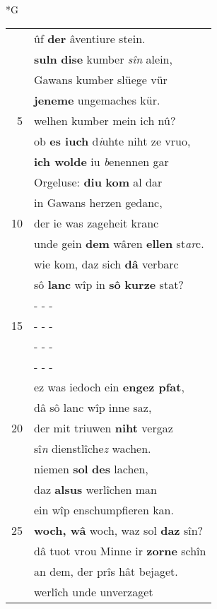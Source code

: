 \documentclass[8pt,a4paper,notitlepage]{article}
\begin{document}
\newpage
\begin{table}[ht]
\begin{minipage}[t]{0.5\linewidth}
\small
\begin{center}*G
\end{center}
\begin{tabular}{rl}
 & ûf \textbf{der} âventiure stein.\\ 
 & \textbf{suln} \textbf{dise} kumber \textit{sîn} alein,\\ 
 & Gawans kumber slüege vür\\ 
 & \textbf{jeneme} ungemaches kür.\\ 
5 & welhen kumber mein ich nû?\\ 
 & ob \textbf{es iuch} d\textit{i}uhte niht ze vruo,\\ 
 & \textbf{ich wolde} iu \textit{b}enennen gar\\ 
 & Orgeluse: \textbf{diu} \textbf{kom} al dar\\ 
 & in Gawans herzen gedanc,\\ 
10 & der ie was zageheit kranc\\ 
 & unde gein \textbf{dem} wâren \textbf{ellen} st\textit{ar}c.\\ 
 & wie kom, daz sich \textbf{dâ} verbarc\\ 
 & sô \textbf{lanc} wîp in \textbf{sô} \textbf{kurze} stat?\\ 
 & \multicolumn{1}{l}{ - - - }\\ 
15 & \multicolumn{1}{l}{ - - - }\\ 
 & \multicolumn{1}{l}{ - - - }\\ 
 & \multicolumn{1}{l}{ - - - }\\ 
 & ez was iedoch ein \textbf{engez pfat},\\ 
 & dâ sô lanc wîp inne saz,\\ 
20 & der mit triuwen \textbf{niht} vergaz\\ 
 & sî\textit{n} dienstlîche\textit{z} wachen.\\ 
 & niemen \textbf{sol} \textbf{des} lachen,\\ 
 & daz \textbf{alsus} werlîchen man\\ 
 & ein wîp enschumpfieren kan.\\ 
25 & \textbf{woch, wâ} woch, waz sol \textbf{daz} sîn?\\ 
 & dâ tuot vrou Minne ir \textbf{zorne} schîn\\ 
 & an dem, der prîs hât bejaget.\\ 
 & werlîch unde unverzaget\\ 

\end{tabular}
\end{minipage}
\end{table}
\end{document}
